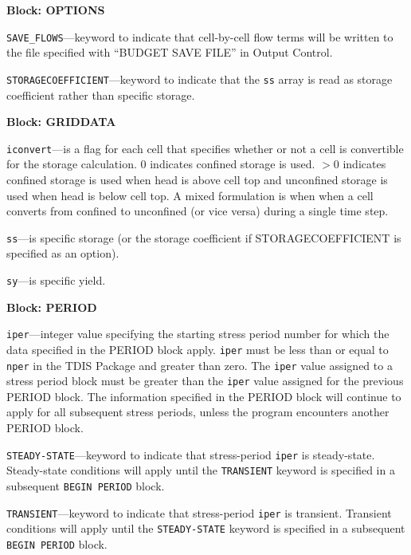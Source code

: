 
\item \textbf{Block: OPTIONS}

\begin{description}
\item \texttt{SAVE\_FLOWS}---keyword to indicate that cell-by-cell flow terms will be written to the file specified with ``BUDGET SAVE FILE'' in Output Control.

\item \texttt{STORAGECOEFFICIENT}---keyword to indicate that the \texttt{ss} array is read as storage coefficient rather than specific storage.

\end{description}
\item \textbf{Block: GRIDDATA}

\begin{description}
\item \texttt{iconvert}---is a flag for each cell that specifies whether or not a cell is convertible for the storage calculation.  0 indicates confined storage is used. $>$0 indicates confined storage is used when head is above cell top and unconfined storage is used when head is below cell top.  A mixed formulation is when when a cell converts from confined to unconfined (or vice versa) during a single time step.

\item \texttt{ss}---is specific storage (or the storage coefficient if STORAGECOEFFICIENT is specified as an option).

\item \texttt{sy}---is specific yield.

\end{description}
\item \textbf{Block: PERIOD}

\begin{description}
\item \texttt{iper}---integer value specifying the starting stress period number for which the data specified in the PERIOD block apply.  \texttt{iper} must be less than or equal to \texttt{nper} in the TDIS Package and greater than zero.  The \texttt{iper} value assigned to a stress period block must be greater than the \texttt{iper} value assigned for the previous PERIOD block.  The information specified in the PERIOD block will continue to apply for all subsequent stress periods, unless the program encounters another PERIOD block.

\item \texttt{STEADY-STATE}---keyword to indicate that stress-period \texttt{iper} is steady-state. Steady-state conditions will apply until the \texttt{TRANSIENT} keyword is specified in a subsequent \texttt{BEGIN PERIOD} block.

\item \texttt{TRANSIENT}---keyword to indicate that stress-period \texttt{iper} is transient. Transient conditions will apply until the \texttt{STEADY-STATE} keyword is specified in a subsequent \texttt{BEGIN PERIOD} block.

\end{description}

